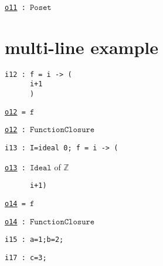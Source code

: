\documentclass[12pt,a4paper]{amsart}
\begin{document}
\noindent\underline{\tt o11}\verb| : |$\texttt{Poset}$
\smallskip


\section{multi-line example}
\smallskip
\begin{verbatim}
i12 : f = i -> (
      i+1
      )
\end{verbatim}
\noindent\underline{\tt o12}\verb| = |$\texttt{f}$

\noindent\underline{\tt o12}\verb| : |$\texttt{FunctionClosure}$
\smallskip



\smallskip
\begin{verbatim}
i13 : I=ideal 0; f = i -> (
\end{verbatim}

\noindent\underline{\tt o13}\verb| : |$\texttt{Ideal}$ of ${\mathbb Z}$
\begin{verbatim}
      i+1)
\end{verbatim}
\noindent\underline{\tt o14}\verb| = |$\texttt{f}$

\noindent\underline{\tt o14}\verb| : |$\texttt{FunctionClosure}$
\smallskip


\smallskip
\begin{verbatim}
i15 : a=1;b=2;
\end{verbatim}
\begin{verbatim}
i17 : c=3;
\end{verbatim}
\smallskip
\end{document}
